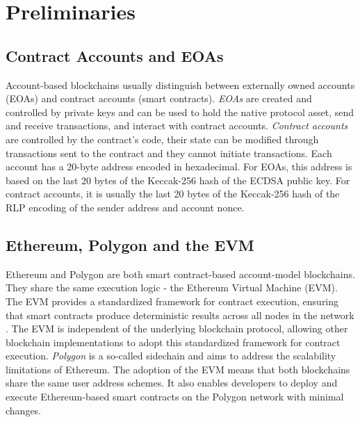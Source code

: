 \documentclass[12pt,a4paper,titlepage,oneside,english]{article}
\begin{document}

\section{Preliminaries}

\subsection{Contract Accounts and EOAs}
Account-based blockchains usually distinguish between externally owned accounts (EOAs) and contract accounts (smart contracts). \textit{EOAs} are created and controlled by private keys and can be used to hold the native protocol asset, send and receive transactions, and interact with contract accounts. \textit{Contract accounts} are controlled by the contract's code, their state can be modified through transactions sent to the contract and they cannot initiate transactions. \citep{buterin2014ethereum} \newline Each account has a 20-byte address encoded in hexadecimal. For EOAs, this address is based on the last 20 bytes of the Keccak-256 hash of the ECDSA public key. For contract accounts, it is usually the last 20 bytes of the Keccak-256 hash of the RLP encoding of the sender address and account nonce. \citep{GW:14}

\subsection{Ethereum, Polygon and the EVM}
Ethereum and Polygon are both smart contract-based account-model blockchains. They share the same execution logic - the Ethereum Virtual Machine (EVM).
The EVM provides a standardized framework for contract execution, ensuring that smart contracts produce deterministic results across all nodes in the network \citep{GW:14}. The EVM is independent of the underlying blockchain protocol, allowing other blockchain implementations to adopt this standardized framework for contract execution.\newline
\textit{Polygon} is a so-called sidechain and aims to address the scalability limitations of Ethereum. The adoption of the EVM means that both blockchains share the same user address schemes. It also enables developers to deploy and execute Ethereum-based smart contracts on the Polygon network with minimal changes. \citep{matic_whitepaper}
\end{document}

